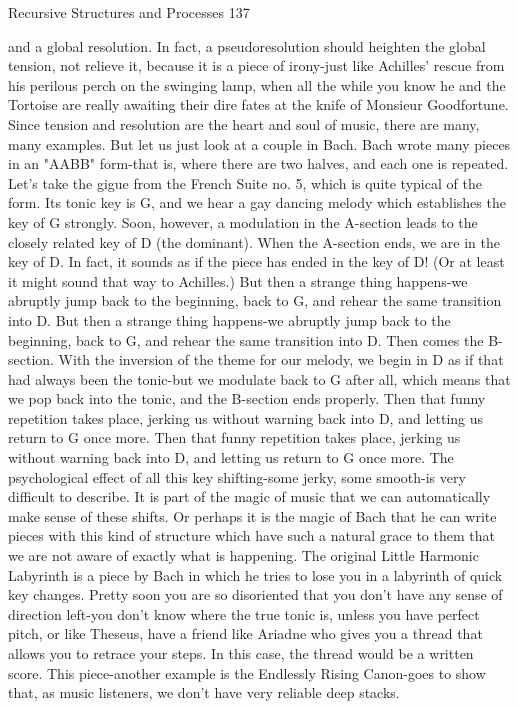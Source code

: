 Recursive Structures and Processes                                                      137

and a global resolution. In fact, a pseudoresolution should heighten the global tension,
not relieve it, because it is a piece of irony-just like Achilles' rescue from his perilous
perch on the swinging lamp, when all the while you know he and the Tortoise are really
awaiting their dire fates at the knife of Monsieur Goodfortune.
        Since tension and resolution are the heart and soul of music, there are many, many
examples. But let us just look at a couple in Bach. Bach wrote many pieces in an
"AABB" form-that is, where there are two halves, and each one is repeated. Let's take the
gigue from the French Suite no. 5, which is quite typical of the form. Its tonic key is G,
and we hear a gay dancing melody which establishes the key of G strongly. Soon,
however, a modulation in the A-section leads to the closely related key of D (the
dominant). When the A-section ends, we are in the key of D. In fact, it sounds as if the
piece has ended in the key of D! (Or at least it might sound that way to Achilles.) But
then a strange thing happens-we abruptly jump back to the beginning, back to G, and
rehear the same transition into D. But then a strange thing happens-we abruptly jump
back to the beginning, back to G, and rehear the same transition into D.
        Then comes the B-section. With the inversion of the theme for our melody, we
begin in D as if that had always been the tonic-but we modulate back to G after all, which
means that we pop back into the tonic, and the B-section ends properly. Then that funny
repetition takes place, jerking us without warning back into D, and letting us return to G
once more. Then that funny repetition takes place, jerking us without warning
        back into D, and letting us return to G once more.
        The psychological effect of all this key shifting-some jerky, some smooth-is very
difficult to describe. It is part of the magic of music that we can automatically make sense
of these shifts. Or perhaps it is the magic of Bach that he can write pieces with this kind
of structure which have such a natural grace to them that we are not aware of exactly
what is happening.
        The original Little Harmonic Labyrinth is a piece by Bach in which he tries to
lose you in a labyrinth of quick key changes. Pretty soon you are so disoriented that you
don't have any sense of direction left-you don't know where the true tonic is, unless you
have perfect pitch, or like Theseus, have a friend like Ariadne who gives you a thread that
allows you to retrace your steps. In this case, the thread would be a written score. This
piece-another example is the Endlessly Rising Canon-goes to show that, as music
listeners, we don't have very reliable deep stacks.


